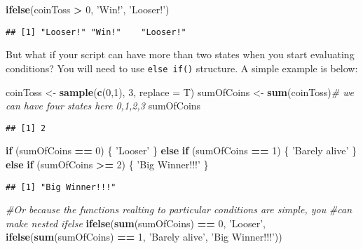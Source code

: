 \documentclass[]{book}
\newenvironment{Shaded}{\begin{snugshade}}{\end{snugshade}}
\newcommand{\KeywordTok}[1]{\textcolor[rgb]{0.13,0.29,0.53}{\textbf{#1}}}
\newcommand{\DataTypeTok}[1]{\textcolor[rgb]{0.13,0.29,0.53}{#1}}
\newcommand{\DecValTok}[1]{\textcolor[rgb]{0.00,0.00,0.81}{#1}}
\newcommand{\StringTok}[1]{\textcolor[rgb]{0.31,0.60,0.02}{#1}}
\newcommand{\CommentTok}[1]{\textcolor[rgb]{0.56,0.35,0.01}{\textit{#1}}}
\newcommand{\ControlFlowTok}[1]{\textcolor[rgb]{0.13,0.29,0.53}{\textbf{#1}}}
\newcommand{\OperatorTok}[1]{\textcolor[rgb]{0.81,0.36,0.00}{\textbf{#1}}}
\newcommand{\NormalTok}[1]{#1}
\theoremstyle{definition}
\theoremstyle{definition}
\theoremstyle{definition}
\theoremstyle{remark}
\begin{document}
\begin{Shaded}
\begin{Highlighting}[]
\KeywordTok{ifelse}\NormalTok{(coinToss }\OperatorTok{>}\StringTok{ }\DecValTok{0}\NormalTok{, }\StringTok{'Win!'}\NormalTok{, }\StringTok{'Looser!'}\NormalTok{)}
\end{Highlighting}
\end{Shaded}

\begin{verbatim}
## [1] "Looser!" "Win!"    "Looser!"
\end{verbatim}

But what if your script can have more than two states when you start
evaluating conditions? You will need to use \texttt{else\ if()}
structure. A simple example is below:

\begin{Shaded}
\begin{Highlighting}[]
\NormalTok{coinToss <-}\StringTok{ }\KeywordTok{sample}\NormalTok{(}\KeywordTok{c}\NormalTok{(}\DecValTok{0}\NormalTok{,}\DecValTok{1}\NormalTok{), }\DecValTok{3}\NormalTok{, }\DataTypeTok{replace =}\NormalTok{ T)}
\NormalTok{sumOfCoins <-}\StringTok{ }\KeywordTok{sum}\NormalTok{(coinToss)}\CommentTok{# we can have four states here 0,1,2,3}
\NormalTok{sumOfCoins}
\end{Highlighting}
\end{Shaded}

\begin{verbatim}
## [1] 2
\end{verbatim}

\begin{Shaded}
\begin{Highlighting}[]
\ControlFlowTok{if}\NormalTok{ (sumOfCoins }\OperatorTok{==}\StringTok{ }\DecValTok{0}\NormalTok{) \{}
  \StringTok{'Looser'}
\NormalTok{\} }\ControlFlowTok{else} \ControlFlowTok{if}\NormalTok{ (sumOfCoins }\OperatorTok{==}\StringTok{ }\DecValTok{1}\NormalTok{) \{}
  \StringTok{'Barely alive'}
\NormalTok{\} }\ControlFlowTok{else} \ControlFlowTok{if}\NormalTok{ (sumOfCoins }\OperatorTok{>=}\StringTok{ }\DecValTok{2}\NormalTok{) \{}
  \StringTok{'Big Winner!!!'}
\NormalTok{\}}
\end{Highlighting}
\end{Shaded}

\begin{verbatim}
## [1] "Big Winner!!!"
\end{verbatim}

\begin{Shaded}
\begin{Highlighting}[]
\CommentTok{#Or because the functions realting to particular conditions are simple, you}
\CommentTok{#can make nested ifelse}
\KeywordTok{ifelse}\NormalTok{(}\KeywordTok{sum}\NormalTok{(sumOfCoins) }\OperatorTok{==}\StringTok{ }\DecValTok{0}\NormalTok{, }\StringTok{'Looser'}\NormalTok{,}
       \KeywordTok{ifelse}\NormalTok{(}\KeywordTok{sum}\NormalTok{(sumOfCoins) }\OperatorTok{==}\StringTok{ }\DecValTok{1}\NormalTok{, }\StringTok{'Barely alive'}\NormalTok{, }\StringTok{'Big Winner!!!'}\NormalTok{))}
\end{Highlighting}
\end{Shaded}
\end{document}
